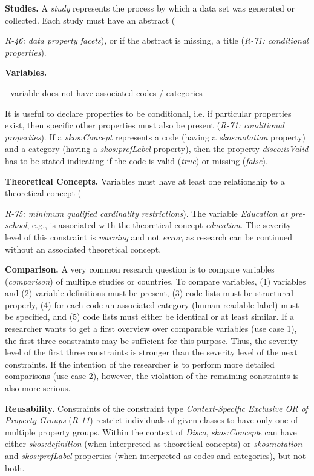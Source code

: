 \documentclass{llncs}
\begin{document}
\textbf{Studies.}
A \emph{study} represents the process by which a data set was generated or collected.
Each study must have an abstract ({\emph{R-46: data property facets}), or if the abstract is missing, a title (\emph{R-71: conditional properties}).

\textbf{Variables.}

- variable does not have associated codes / categories

It is useful to declare properties to be conditional, i.e. if particular properties exist, then specific other properties must also be present (\emph{R-71: conditional properties}).
If a {\em skos:Concept} represents a code (having a {\em skos:notation} property) and a category (having a {\em skos:prefLabel} property), 
then the property {\em disco:isValid} has to be stated indicating if the code is valid (\emph{true}) or missing (\emph{false}).

\textbf{Theoretical Concepts.}
Variables must have at least one relationship to a theoretical concept ({\emph{R-75: minimum qualified cardinality restrictions}).
The variable \emph{Education at pre-school}, e.g., is associated with the theoretical concept \emph{education}. 
The severity level of this constraint is \emph{warning} and not \emph{error}, as research can be continued without an associated theoretical concept.

\textbf{Comparison.}
A very common research question is to compare variables (\emph{comparison}) of multiple studies or countries.
To compare variables, 
(1) variables and (2) variable definitions must be present,
(3) code lists must be structured properly,
(4) for each code an associated category (human-readable label) must be specified, and
(5) code lists must either be identical or at least similar.
If a researcher wants to get a first overview over comparable variables (use case 1), 
the first three constraints may be sufficient for this purpose.
Thus, the severity level of the first three constraints is stronger than the severity level of the next constraints.
If the intention of the researcher is to perform more detailed comparisons (use case 2), however, the violation of the remaining constraints is also more serious.

\textbf{Reusability.}
Constraints of the constraint type \emph{Context-Specific Exclusive OR of Property Groups} (\emph{R-11})
restrict individuals of given classes to have only one of multiple property groups.
Within the context of \emph{Disco}, \emph{skos:Concept}s can have either \emph{skos:definition} (when interpreted as theoretical concepts) or \emph{skos:notation} and \emph{skos:prefLabel} properties (when interpreted as codes and categories), but not both.

}}
\end{document}
